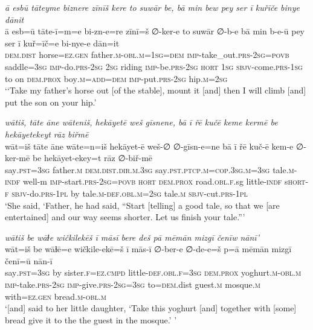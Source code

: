 \ea \label{KŠ.96}
\textit{ā esbū tāteyme biznere zīnīš kere to suwār be, bā min bew pey ser ī kuřīče binye dānit} \\ 
\gll ā esb=ū tāte-ī=m=e bi-zn-e=re zīnī=š ∅-ker-e to suwār ∅-b-e bā min b-e-ū pey ser ī kuř=īč=e bi-nye-e dān=it \\ 
 \textsc{dem.dist} horse\textsc{\textsc{=ez.gen}} father\textsc{.m}\textsc{-obl}\textsc{.m}\textsc{=\textsc{1sg}}\textsc{=dem} \textsc{imp-}take\_out\textsc{.prs}-\textsc{2sg}\textsc{=\textsc{povb}} saddle\textsc{=3sg} \textsc{imp-}do\textsc{.prs}-\textsc{2sg} \textsc{2sg} riding \textsc{imp-}be\textsc{.prs}-\textsc{2sg} \textsc{hort} \textsc{1sg} \textsc{sbjv-}come\textsc{.prs}\textsc{-\textsc{1sg}} to on \textsc{dem.prox} boy\textsc{.m}\textsc{=add}\textsc{=dem} \textsc{imp-}put\textsc{.prs}-\textsc{2sg} hip\textsc{.m}\textsc{=\textsc{2sg}} \\ 
\glt `‘Take my father’s horse out [of the stable], mount it [and] then I will climb [and] put the son on your hip.'
\z 
 
\ea \label{ŽH.27}
\textit{wātiš, tāte āne wāteniš, hekāyetē weš gīsnene, bā ī řē kučē keme kermē be hekāyetekeyt rāz biřmē} \\ 
\gll wāt=iš tāte āne wāte=n=iš hekāyet-ē weš-∅ ∅-gīsn-e=ne bā ī řē kuč-ē kem-e ∅-ker-mē be hekāyet-ekey=t rāz ∅-biř-mē \\ 
 say\textsc{.pst}\textsc{=3sg} father\textsc{.m} \textsc{dem.dist}\textsc{.dir}\textsc{.m}\textsc{.3sg} say\textsc{.pst}\textsc{.ptcp}\textsc{.m}\textsc{=cop}\textsc{.3sg}\textsc{.m}\textsc{=3sg} tale\textsc{.m}\textsc{-indf} well-m \textsc{imp-}start\textsc{.prs}-\textsc{2sg}\textsc{=\textsc{povb}} \textsc{hort} \textsc{dem.prox} road\textsc{.obl}\textsc{\textsc{.f}}.sg little\textsc{-indf} s\textsc{hort}\textsc{-f} \textsc{sbjv-}do\textsc{.prs}\textsc{-1pl} by tale\textsc{.m}\textsc{-def}\textsc{.obl}\textsc{.m}\textsc{=\textsc{2sg}} tale\textsc{.m} \textsc{sbjv-}cut\textsc{.prs}\textsc{-1pl} \\ 
\glt `She said, ‘Father, he had said, “Start [telling] a good tale, so that we [are entertained] and our way seems shorter. Let us finish your tale.”'
\z 
 
\ea \label{ŽH.40}
\textit{wātiš be wāɫe wičkilekēš ī māsī bere deš pā mēmān mizgī čenīw nānī’} \\ 
\gll wāt=iš be wāɫē=e wičkile-ekē=š ī mās-ī ∅-ber-e ∅-de-e=š p=ā mēmān mizgī čenī=ū nān-ī \\ 
 say\textsc{.pst}\textsc{=3sg} by sister\textsc{\textsc{.f}}\textsc{=ez}\textsc{.cmpd} little\textsc{-def}\textsc{.obl}\textsc{\textsc{.f}}\textsc{=3sg} \textsc{dem.prox} yoghurt\textsc{.m}\textsc{-obl}\textsc{.m} \textsc{imp-}take\textsc{.prs}-\textsc{2sg} \textsc{imp-}give\textsc{.prs}-\textsc{2sg}\textsc{=3sg} to\textsc{=dem}.dist guest\textsc{.m} mosque\textsc{.m} with\textsc{=ez}\textsc{.gen} bread\textsc{.m}\textsc{-obl}\textsc{.m} \\ 
\glt `[and] said to her little daughter, ‘Take this yoghurt [and] together with [some] bread give it to the the guest in the mosque.’ '
\z 
 
